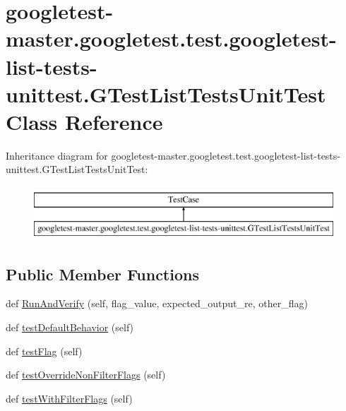 \hypertarget{classgoogletest-master_1_1googletest_1_1test_1_1googletest-list-tests-unittest_1_1_g_test_list_tests_unit_test}{}\section{googletest-\/master.googletest.\+test.\+googletest-\/list-\/tests-\/unittest.G\+Test\+List\+Tests\+Unit\+Test Class Reference}
\label{classgoogletest-master_1_1googletest_1_1test_1_1googletest-list-tests-unittest_1_1_g_test_list_tests_unit_test}
Inheritance diagram for googletest-\/master.googletest.\+test.\+googletest-\/list-\/tests-\/unittest.G\+Test\+List\+Tests\+Unit\+Test\+:\begin{figure}[H]
\begin{center}
\leavevmode
\includegraphics[height=2.000000cm]{db/dba/classgoogletest-master_1_1googletest_1_1test_1_1googletest-list-tests-unittest_1_1_g_test_list_tests_unit_test}
\end{center}
\end{figure}
\subsection*{Public Member Functions}
\begin{DoxyCompactItemize}
\item 
def \mbox{\hyperlink{classgoogletest-master_1_1googletest_1_1test_1_1googletest-list-tests-unittest_1_1_g_test_list_tests_unit_test_a6b1eb6c1a7c68f525a82d8bb7918c22a}{Run\+And\+Verify}} (self, flag\+\_\+value, expected\+\_\+output\+\_\+re, other\+\_\+flag)
\item 
def \mbox{\hyperlink{classgoogletest-master_1_1googletest_1_1test_1_1googletest-list-tests-unittest_1_1_g_test_list_tests_unit_test_a16482779da4bb806728ced8803582d2f}{test\+Default\+Behavior}} (self)
\item 
def \mbox{\hyperlink{classgoogletest-master_1_1googletest_1_1test_1_1googletest-list-tests-unittest_1_1_g_test_list_tests_unit_test_a29c3eca10567b17ad3e579ca06060ea6}{test\+Flag}} (self)
\item 
def \mbox{\hyperlink{classgoogletest-master_1_1googletest_1_1test_1_1googletest-list-tests-unittest_1_1_g_test_list_tests_unit_test_a761d821a5f1db1fdfe1db381a1da2c54}{test\+Override\+Non\+Filter\+Flags}} (self)
\item 
def \mbox{\hyperlink{classgoogletest-master_1_1googletest_1_1test_1_1googletest-list-tests-unittest_1_1_g_test_list_tests_unit_test_a8a2fdd41b3984bc796c8afe142c7fa93}{test\+With\+Filter\+Flags}} (self)
\end{DoxyCompactItemize}


